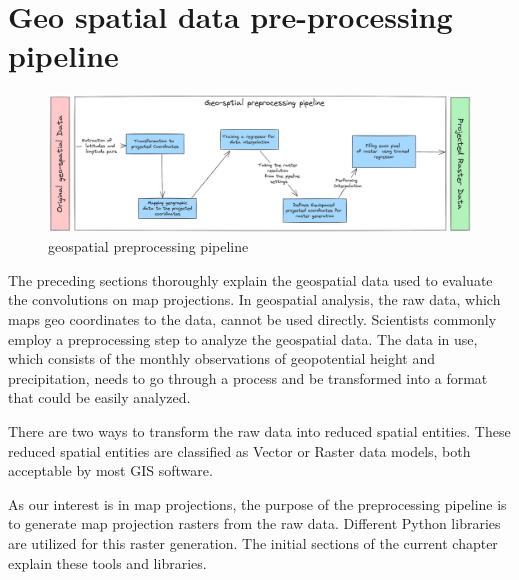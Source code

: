 \clearpage
\cleardoublepage

\chapter{Geo spatial data pre-processing pipeline}
\begin{figure}[h]
    \centering
    \includegraphics[width=1.0\linewidth]{figures/chapter-7/preprocessing_pipeline.png}
    \caption{geospatial preprocessing pipeline}
    \label{fig:preprocessingpipeline}
\end{figure}
The preceding sections thoroughly explain the geospatial data used to evaluate the convolutions on map projections. In geospatial analysis, the raw data, which maps geo coordinates to the data, cannot be used directly. Scientists commonly employ a preprocessing step to analyze the geospatial data. The data in use, which consists of the monthly observations of geopotential height and precipitation, needs to go through a process and be transformed into a format that could be easily analyzed.

There are two ways to transform the raw data into reduced spatial entities. These reduced spatial entities are classified as Vector or Raster data models, both acceptable by most GIS software.

As our interest is in map projections, the purpose of the preprocessing pipeline is to generate map projection rasters from the raw data. Different Python libraries are utilized for this raster generation. The initial sections of the current chapter explain these tools and libraries.

